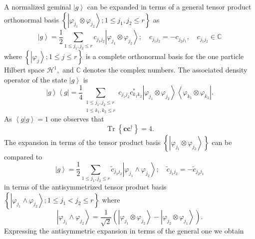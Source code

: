 \documentclass[preprint,aps,showkeys]{revtex4}%
\begin{document}
A normalized geminal $\left\vert g\right\rangle $ can be expanded in terms of
a general tensor product orthonormal basis $\left\{  \left\vert \varphi
_{j_{1}}\otimes\varphi_{j_{2}}\right\rangle ;1\leq j_{1},j_{2}\leq r\right\}
$ as
\begin{equation}
\left\vert g\right\rangle =\frac{1}{2}\sum_{1\leq j_{1},j_{2}\leq r}%
c_{j_{1}j_{2}}\left\vert \varphi_{j_{1}}\otimes\varphi_{j_{2}}\right\rangle
;\quad c_{j_{1}j_{2}}=-c_{j_{2}j_{1}},\quad c_{j_{1}j_{2}}\in\mathbb{C}%
\end{equation}
where $\left\{  \left\vert \varphi_{j}\right\rangle ;1\leq j\leq r\right\}  $
is a complete orthonormal basis for the one particle Hilbert space
$\mathcal{H}^{1},$ and $\mathbb{C}$ denotes the complex numbers. The
associated density operator of the state $\left\vert g\right\rangle $ is
\begin{equation}
\left\vert g\right\rangle \left\langle g\right\vert =\frac{1}{4}%
\sum_{\substack{1\leq j_{1},j_{2}\leq r\\1\leq k_{1},k_{2}\leq r}%
}c_{j_{1}j_{2}}c_{k_{1}k_{2}}^{\ast}\left\vert \varphi_{j_{1}}\otimes
\varphi_{j_{2}}\right\rangle \left\langle \varphi_{k_{1}}\otimes\varphi
_{k_{2}}\right\vert .
\end{equation}
As $\left\langle g|g\right\rangle =1$ one observes that
\begin{equation}
\operatorname{Tr}\left\{  \mathbf{cc}^{\dagger}\right\}  =4.
\end{equation}
The expansion in terms of the tensor product basis $\left\{  \left\vert
\varphi_{j_{1}}\otimes\varphi_{j_{2}}\right\rangle \right\}  $ can be compared
to
\begin{equation}
\left\vert g\right\rangle =\frac{1}{2}\sum_{1\leq j_{1},j_{2}\leq r}\tilde
{c}_{j_{1}j_{2}}\left\vert \varphi_{j_{1}}\wedge\varphi_{j_{2}}\right\rangle
;\quad\tilde{c}_{j_{1}j_{2}}=-\tilde{c}_{j_{2}j_{1}}%
\end{equation}
in terms of the antisymmetrized tensor product basis $\left\{  \left\vert
\varphi_{j_{1}}\wedge\varphi_{j_{2}}\right\rangle ;1\leq j_{1}<j_{2}\leq
r\right\}  $ where
\begin{equation}
\left\vert \varphi_{j_{1}}\wedge\varphi_{j_{2}}\right\rangle =\frac{1}%
{\sqrt{2}}\left(  \left\vert \varphi_{j_{1}}\otimes\varphi_{j_{2}%
}\right\rangle -\left\vert \varphi_{j_{2}}\otimes\varphi_{j_{1}}\right\rangle
\right)  .
\end{equation}
Expressing the antisymmetric expansion in terms of the general one we obtain
\end{document}
